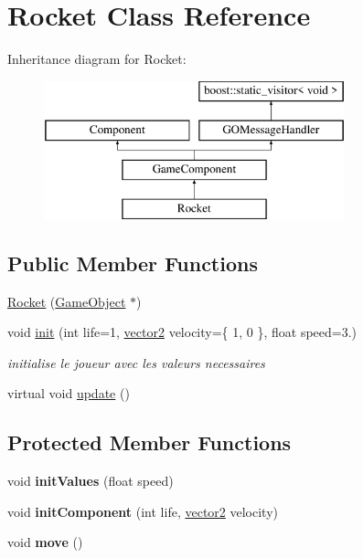 \hypertarget{class_rocket}{}\section{Rocket Class Reference}
\label{class_rocket}
Inheritance diagram for Rocket\+:\begin{figure}[H]
\begin{center}
\leavevmode
\includegraphics[height=4.000000cm]{class_rocket}
\end{center}
\end{figure}
\subsection*{Public Member Functions}
\begin{DoxyCompactItemize}
\item 
\hyperlink{class_rocket_aa1ab185c1ec59b4983114b41efd59ea0}{Rocket} (\hyperlink{class_game_object}{Game\+Object} $\ast$)
\item 
void \hyperlink{class_rocket_a073b8a2f1f13fe147973413803438860}{init} (int life=1, \hyperlink{structvector2}{vector2} velocity=\{ 1, 0 \}, float speed=3.)
\begin{DoxyCompactList}\small\item\em initialise le joueur avec les valeurs necessaires \end{DoxyCompactList}\item 
virtual void \hyperlink{class_rocket_aa0f4dcf673358e841e4b4b2fa0b1462e}{update} ()
\end{DoxyCompactItemize}
\subsection*{Protected Member Functions}
\begin{DoxyCompactItemize}
\item 
\hypertarget{class_rocket_aa73e743c57e1be5dd4c23c3dc5bc498f}{}\label{class_rocket_aa73e743c57e1be5dd4c23c3dc5bc498f} 
void {\bfseries init\+Values} (float speed)
\item 
\hypertarget{class_rocket_a3f444dd351e952656067724b1fc7b1ee}{}\label{class_rocket_a3f444dd351e952656067724b1fc7b1ee} 
void {\bfseries init\+Component} (int life, \hyperlink{structvector2}{vector2} velocity)
\item 
\hypertarget{class_rocket_aa9131c195e7b644b036f745df9b00e94}{}\label{class_rocket_aa9131c195e7b644b036f745df9b00e94} 
void {\bfseries move} ()
\end{DoxyCompactItemize}
